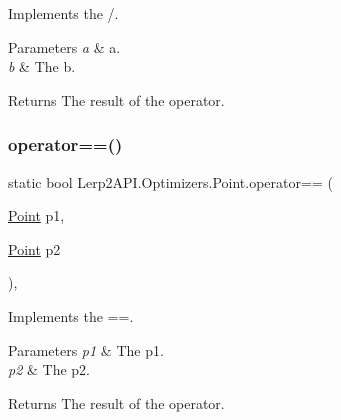 Implements the /. 


\begin{DoxyParams}{Parameters}
{\em a} & a.\\
\hline
{\em b} & The b.\\
\hline
\end{DoxyParams}
\begin{DoxyReturn}{Returns}
The result of the operator.
\end{DoxyReturn}
\mbox{\label{struct_lerp2_a_p_i_1_1_optimizers_1_1_point_ae4335b232db05f2c71089b204fe72218}} 
\subsubsection{\texorpdfstring{operator==()}{operator==()}}
{\footnotesize\ttfamily static bool Lerp2\+A\+P\+I.\+Optimizers.\+Point.\+operator== (\begin{DoxyParamCaption}\item[{\hyperlink{struct_lerp2_a_p_i_1_1_optimizers_1_1_point}{Point}}]{p1,  }\item[{\hyperlink{struct_lerp2_a_p_i_1_1_optimizers_1_1_point}{Point}}]{p2 }\end{DoxyParamCaption})\hspace{0.3cm}{\ttfamily [inline]}, {\ttfamily [static]}}



Implements the ==. 


\begin{DoxyParams}{Parameters}
{\em p1} & The p1.\\
\hline
{\em p2} & The p2.\\
\hline
\end{DoxyParams}
\begin{DoxyReturn}{Returns}
The result of the operator.
\end{DoxyReturn}
\mbox{\label{struct_lerp2_a_p_i_1_1_optimizers_1_1_point_a9e5608f09142f6e9ed1c8f29d0c7b78e}} 
